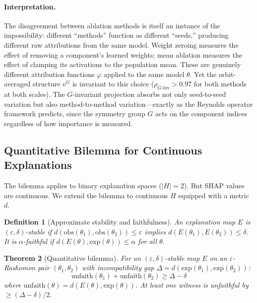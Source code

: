 \documentclass{article}
\newtheorem{theorem}{Theorem}
\newtheorem{definition}[theorem]{Definition}
\begin{document}
\paragraph{Interpretation.}
The disagreement between ablation methods is itself an instance of the impossibility: different ``methods'' function as different ``seeds,'' producing different raw attributions from the same model. Weight zeroing measures the effect of removing a component's learned weights; mean ablation measures the effect of clamping its activations to the population mean. These are genuinely different attribution functions $\varphi$ applied to the same model $\theta$. Yet the orbit-averaged structure $v^G$ is invariant to this choice ($\rho_{G\text{-inv}} > 0.97$ for both methods at both scales). The $G$-invariant projection absorbs not only seed-to-seed variation but also method-to-method variation---exactly as the Reynolds operator framework predicts, since the symmetry group $G$ acts on the component indices regardless of how importance is measured.

\subsection{Quantitative Bilemma for Continuous Explanations}
\label{sec:quantitative-bilemma}

The bilemma applies to binary explanation spaces ($|H| = 2$). But SHAP values are continuous. We extend the bilemma to continuous $H$ equipped with a metric $d$.

\begin{definition}[Approximate stability and faithfulness]
An explanation map $E$ is \emph{$(\varepsilon, \delta)$-stable} if $d(\text{obs}(\theta_1), \text{obs}(\theta_2)) \leq \varepsilon$ implies $d(E(\theta_1), E(\theta_2)) \leq \delta$. It is \emph{$\alpha$-faithful} if $d(E(\theta), \text{exp}(\theta)) \leq \alpha$ for all $\theta$.
\end{definition}

\begin{theorem}[Quantitative bilemma]\label{thm:quantitative-bilemma}
For an $(\varepsilon, \delta)$-stable map $E$ on an $\varepsilon$-Rashomon pair $(\theta_1, \theta_2)$ with incompatibility gap $\Delta = d(\text{exp}(\theta_1), \text{exp}(\theta_2))$:
$$\text{unfaith}(\theta_1) + \text{unfaith}(\theta_2) \geq \Delta - \delta$$
where $\text{unfaith}(\theta) = d(E(\theta), \text{exp}(\theta))$. At least one witness is unfaithful by $\geq (\Delta - \delta)/2$.
\end{theorem}
\end{document}
